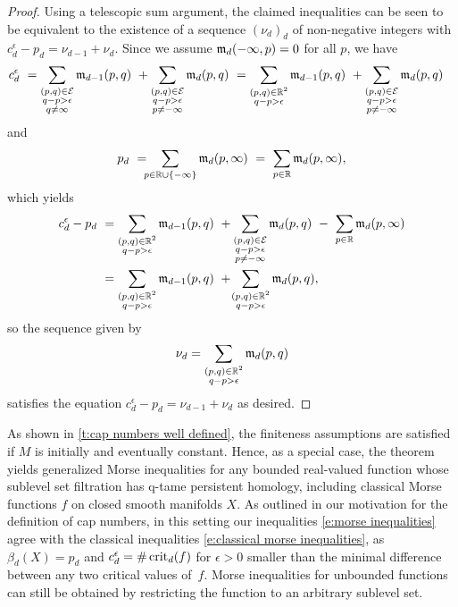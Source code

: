 \begin{proof}
	Using a telescopic sum argument, the claimed inequalities can be seen to be equivalent to the existence of a sequence $(\nu_d)_d$ of non-negative integers with $c_{d}^{\epsilon} - p_{d} = \nu_{d-1} + \nu_{d}$.
	Since we assume $\mathfrak{m}_d(-\infty, p) = 0$ for all $p$, we have
	\begin{align*}
	c_{d}^{\epsilon} \ &=
	\sum_{\substack{(p,q) \in \mathcal{E} \\ q-p > \epsilon \\ q \neq \infty}} \mathfrak{m}_{d-1}(p,q) \ +
	\sum_{\substack{(p,q) \in \mathcal{E} \\ q-p > \epsilon \\ p \neq -\infty}} \mathfrak{m}_d(p,q) \ =
	\sum_{\substack{(p,q) \in \mathbb{R}^2 \\ q-p > \epsilon }} \mathfrak{m}_{d-1}(p,q) \ +
	\sum_{\substack{(p,q) \in \mathcal{E} \\ q-p > \epsilon \\ p \neq -\infty}} \mathfrak{m}_d(p,q)
	\end{align*}
	and
	\begin{equation*}
	p_{d} \ = \!\!\!
	\sum_{p \in \mathbb{R} \cup \{-\infty\}} \mathfrak{m}_d(p,\infty) \ = \
	\sum_{p \in \mathbb{R}} \mathfrak{m}_d(p,\infty),
	\end{equation*}
	which yields
	\begin{align*}
	c_{d}^{\epsilon} - p_{d} \ &=
	\sum_{\substack{(p,q) \in \mathbb{R}^2 \\ q-p > \epsilon}} \mathfrak{m}_{d-1}(p,q) \ +
	\sum_{\substack{(p,q) \in \mathcal{E} \\ q-p > \epsilon \\ p \neq -\infty}} \mathfrak{m}_d(p,q) \ - \
	\sum_{p \in \mathbb{R}} \mathfrak{m}_d(p,\infty) \\ &=
	\sum_{\substack{(p,q) \in \mathbb{R}^2 \\ q-p > \epsilon}} \mathfrak{m}_{d-1}(p,q)
	\ + \!
	\sum_{\substack{(p,q) \in \mathbb{R}^2 \\ q-p > \epsilon}} \mathfrak{m}_d(p,q),
	\end{align*}
	so the sequence given by
	\[\nu_d = \sum_{\substack{(p,q) \in \mathbb{R}^2 \\ q-p > \epsilon}} \mathfrak{m}_d(p,q)\]
	satisfies the equation $c_{d}^{\epsilon} - p_{d} = \nu_{d-1} + \nu_{d}$ as desired.
\end{proof}

As shown in \cref{t:cap numbers well defined}, the finiteness assumptions are satisfied if $M$ is initially and eventually constant.
Hence, as a special case, the theorem yields generalized Morse inequalities for any bounded real-valued function whose sublevel set filtration has q-tame persistent homology, including classical Morse functions $f$ on closed smooth manifolds $X$.
As outlined in our motivation for the definition of cap numbers, in this setting our inequalities \eqref{e:morse inequalities} agree with the classical inequalities \eqref{e:classical morse inequalities}, as $\beta_d(X) = p_d$ and $c_d^{\epsilon} = \# \operatorname{crit}_d(f)$ for $\epsilon > 0$ smaller than the minimal difference between any two critical values of~$f$.
Morse inequalities for unbounded functions can still be obtained by restricting the function to an arbitrary sublevel set.

